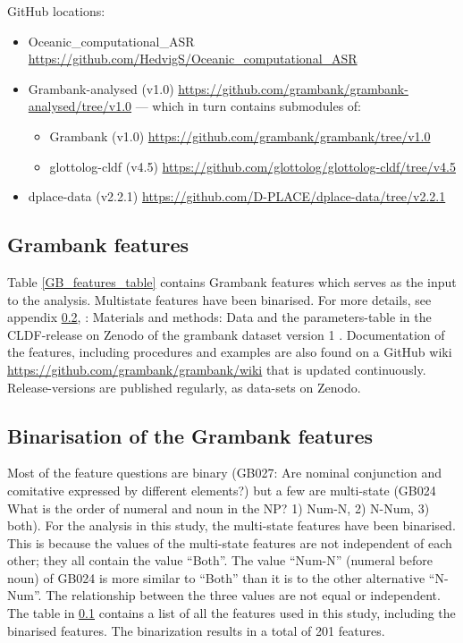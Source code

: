 \documentclass[12pt,letterpaper]{article}
\begin{document}
GitHub locations:
\begin{itemize}
\item Oceanic\_computational\_ASR \url{https://github.com/HedvigS/Oceanic_computational_ASR}
\item Grambank-analysed (v1.0) \url{https://github.com/grambank/grambank-analysed/tree/v1.0} --- which in turn contains submodules of:
\begin{itemize}
\item Grambank (v1.0) \url{https://github.com/grambank/grambank/tree/v1.0}
\item glottolog-cldf (v4.5) \url{https://github.com/glottolog/glottolog-cldf/tree/v4.5}
\end{itemize}
\item dplace-data (v2.2.1) \url{https://github.com/D-PLACE/dplace-data/tree/v2.2.1}
\end{itemize}



\subsection{Grambank features}
\label{Grambank_features}
Table \ref{GB_features_table} contains Grambank features which serves as the input to the analysis. Multistate features have been binarised. For more details, see appendix \ref{supp:dataset_details}, \citet{grambank_release}: Materials and methods: Data and the parameters-table in the CLDF-release on Zenodo of the grambank dataset version 1 \citep{grambank_dataset_zenodo_v1}. Documentation of the features, including procedures and examples are also found on a GitHub wiki  \url{https://github.com/grambank/grambank/wiki} that is updated continuously. Release-versions are published regularly, as data-sets on Zenodo.






\FloatBarrier

\subsection{Binarisation of the Grambank features}
\label{supp:dataset_details}
Most of the feature questions are binary (GB027: Are nominal conjunction and comitative expressed by different elements?) but a few are multi-state (GB024 What is the order of numeral and noun in the NP? 1) Num-N, 2) N-Num, 3) both). For the analysis in this study, the multi-state features have been binarised. This is because the values of the multi-state features are not independent of each other; they all contain the value ``Both''. The value ``Num-N'' (numeral before noun) of GB024 is more similar to ``Both'' than it is to the other alternative ``N-Num''. The relationship between the three values are not equal or independent. The table in \ref{Grambank_features} contains a list of all the features used in this study, including the binarised features. The binarization results in a total of 201 features. 
\end{document}
